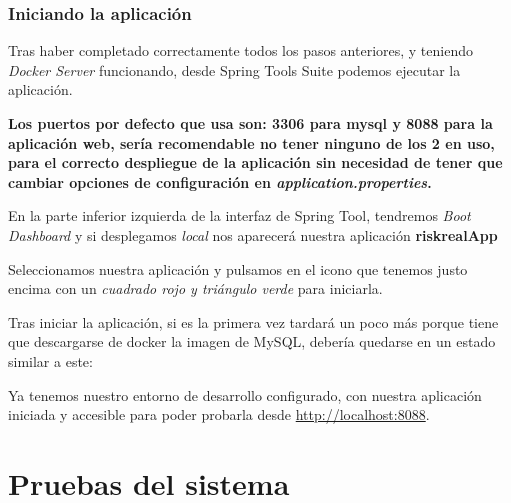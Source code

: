 
\subsubsection{Iniciando la aplicación}

Tras haber completado correctamente todos los pasos anteriores, y teniendo \textit{Docker Server} funcionando, desde Spring Tools Suite podemos ejecutar la aplicación.

\textbf{Los puertos por defecto que usa son: 3306 para mysql y 8088 para la aplicación web, sería recomendable no tener ninguno de los 2 en uso, para el correcto despliegue de la aplicación sin necesidad de tener que cambiar opciones de configuración en \textit{application.properties}.}

En la parte inferior izquierda de la interfaz de Spring Tool, tendremos \textit{Boot Dashboard} y si desplegamos \textit{local} nos aparecerá nuestra aplicación \textbf{riskrealApp}

Seleccionamos nuestra aplicación y pulsamos en el icono que tenemos justo encima con un \textit{cuadrado rojo y triángulo verde} para iniciarla.


Tras iniciar la aplicación, si es la primera vez tardará un poco más porque tiene que descargarse de docker la imagen de MySQL, debería quedarse en un estado similar a este:



Ya tenemos nuestro entorno de desarrollo configurado, con nuestra aplicación iniciada y accesible para poder probarla desde \url{http://localhost:8088}.



\section{Pruebas del sistema}
